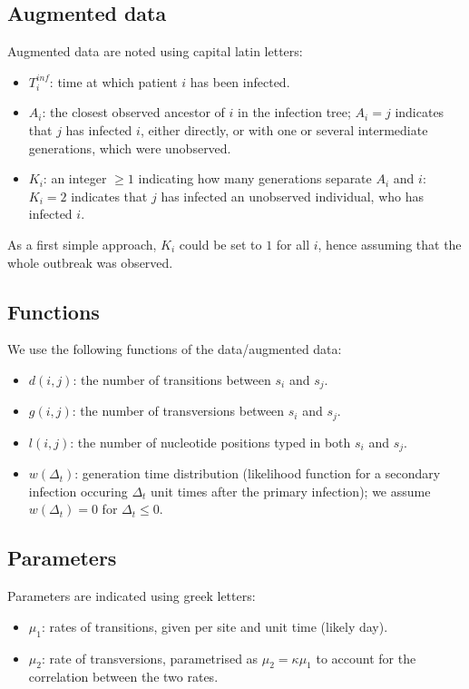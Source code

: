 \documentclass[10pt]{article}
\begin{document}
\subsection*{Augmented data}
Augmented data are noted using capital latin letters:
\begin{itemize}
	\item $T_i^{inf}$: time at which patient $i$ has been infected.
	\item $A_i$: the closest observed ancestor of $i$ in the infection tree; $A_i=j$ indicates that $j$ has infected $i$, either directly, or with one or several intermediate generations, which were unobserved. 
	\item $K_i$: an integer $\geq 1$ indicating how many generations separate $A_i$ and $i$: $K_i=2$ indicates that $j$ has infected an unobserved individual, who has infected $i$.
\end{itemize}

As a first simple approach, $K_i$ could be set to $1$ for all $i$, hence assuming that the whole outbreak was observed.



\subsection*{Functions}
We use the following functions of the data/augmented data:
\begin{itemize}
	\item $d(i,j)$: the number of transitions between $s_i$ and $s_j$.
 	\item $g(i,j)$: the number of transversions between $s_i$ and $s_j$.
 	\item $l(i,j)$: the number of nucleotide positions typed in both $s_i$ and $s_j$.
 	\item $w(\Delta_t)$: generation time distribution (likelihood function for a secondary infection occuring $\Delta_t$ unit times after the primary infection); we assume $w(\Delta_t)=0$ for $\Delta_t \leq 0$.
\end{itemize}





\subsection*{Parameters}
Parameters are indicated using greek letters:
\begin{itemize}
	\item $\mu_1$: rates of transitions, given per site and unit time (likely day).
	\item $\mu_2 $: rate of transversions, parametrised as $\mu_2 = \kappa \mu_1$ to account for the correlation between the two rates.
\end{itemize}
\end{document}
